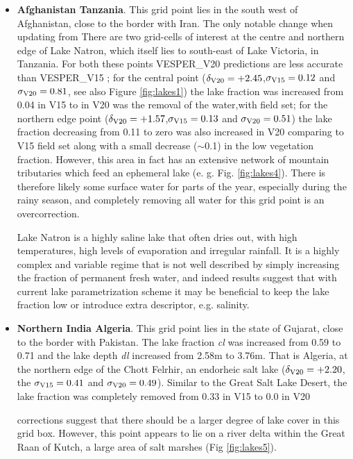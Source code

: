 \documentclass[hess, twostagejnl]{copernicus}
\providecommand{\DIFadd}[1]{{\protect\color{blue} \sf #1}} %
\providecommand{\DIFdel}[1]{{\protect\color{red} \scriptsize #1}} %
\providecommand{\DIFaddbegin}{} %
\providecommand{\DIFaddend}{} %
\providecommand{\DIFdelbegin}{} %
\providecommand{\DIFdelend}{} %
\begin{document}
\begin{itemize}
	\item \textbf{\DIFdelbegin \DIFdel{Afghanistan}\DIFdelend \DIFaddbegin \DIFadd{Tanzania}\DIFaddend }. \DIFdelbegin \DIFdel{This grid point lies in the south west of Afghanistan, close to the border with Iran. The only notable change when updating from }\DIFdelend \DIFaddbegin \DIFadd{There are two grid-cells of interest at the centre and northern edge of Lake Natron, which itself lies to south-east of Lake Victoria, in Tanzania. For both these points VESPER\_V20 predictions are less accurate than VESPER\_}\DIFaddend V15\DIFaddbegin \DIFadd{; for the central point ($\delta_{\rm V20} = +2.45$,$\sigma_{\rm V15} = 0.12$ and $\sigma_{\rm V20}=0.81$, see also Figure \ref{fig:lakes1}) the lake fraction was increased from 0.04 in V15 }\DIFaddend to \DIFaddbegin \DIFadd{0.39 in }\DIFaddend V20 \DIFdelbegin \DIFdel{was the removal of the water,with }\DIFdelend \DIFaddbegin \DIFadd{field set; for the northern edge point ($\delta_{\rm V20} = +1.57$,$\sigma_{\rm V15} = 0.13$ and $\sigma_{\rm V20}=0.51$) }\DIFaddend the lake fraction \DIFdelbegin \DIFdel{decreasing from 0.11 to zero}\DIFdelend \DIFaddbegin \DIFadd{was also increased in V20 comparing to V15 field set along with a small decrease ($\sim$0.1) in the low vegetation fraction}\DIFaddend . However, \DIFdelbegin \DIFdel{this area in fact has an extensive network of mountain tributaries which feed an ephemeral lake (e. g. Fig. \ref{fig:lakes4}). There is therefore likely some surface water for parts of the year, especially during the rainy season, and completely removing all water for this grid point  is an overcorrection.}\DIFdelend \DIFaddbegin \DIFadd{Lake Natron is a highly saline lake that often dries out, with high temperatures, high levels of evaporation and irregular rainfall. It is a highly complex and variable regime that is not well described by simply increasing the fraction of permanent fresh water, and indeed results suggest that with current lake parametrization scheme it may be beneficial to keep the lake fraction low or introduce extra descriptor, e.g. salinity. 

}\DIFaddend 

	\item \textbf{\DIFdelbegin \DIFdel{Northern India}\DIFdelend \DIFaddbegin \DIFadd{Algeria}\DIFaddend }. This grid point lies in \DIFdelbegin \DIFdel{the state of Gujarat, close to the border with Pakistan. The lake fraction \textit{cl} was increased from 0.59 to 0.71 and the lake depth \textit{dl} increased from 2.58m to 3.76m. That is }\DIFdelend \DIFaddbegin \DIFadd{Algeria, at the northern edge of the Chott Felrhir, an endorheic salt lake ($\delta_{\rm V20} = +2.20$}\DIFaddend , \DIFdelbegin \DIFdel{the }\DIFdelend \DIFaddbegin \DIFadd{$\sigma_{\rm V15} = 0.41$ and $\sigma_{\rm V20}=0.49$). Similar to the Great Salt Lake Desert, the lake fraction was completely removed from 0.33 in V15 to 0.0 in }\DIFaddend V20\DIFdelbegin \DIFdel{corrections suggest that there should be a larger degree of lake cover in this grid box. However, this point appears to lie on a river delta within the Great Raan of Kutch, a large area of salt marshes (Fig \ref{fig:lakes5}).  
	
}
\end{itemize}
\end{document}

